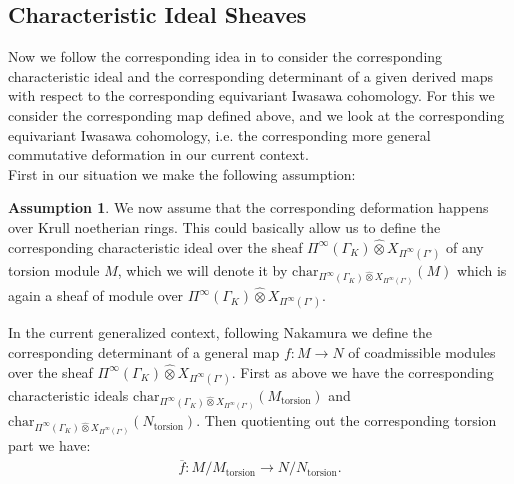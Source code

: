 \documentclass[12pt]{amsart}
\theoremstyle{definition}
\numberwithin{equation}{section}
\newtheorem{assumption}[theorem]{Assumption}
\begin{document}
\subsection{Characteristic Ideal Sheaves} \label{section5.2}


\indent Now we follow the corresponding idea in \cite{Nakamura1} to consider the corresponding characteristic ideal and the corresponding determinant of a given derived maps with respect to the corresponding equivariant Iwasawa cohomology. For this we consider the corresponding map defined above, and we look at the corresponding equivariant Iwasawa cohomology, i.e. the corresponding more general commutative deformation in our current context.\\

\indent First in our situation we make the following assumption:

\begin{assumption}
We now assume that the corresponding deformation happens over Krull noetherian rings. This could basically allow us to define the corresponding characteristic ideal over the sheaf $\Pi^\infty(\Gamma_K)\widehat{\otimes} X_{\Pi^\infty(\Gamma')}$ of any torsion module $M$, which we will denote it by $\mathrm{char}_{\Pi^\infty(\Gamma_K)\widehat{\otimes}X_{\Pi^\infty(\Gamma')}}(M)$ which is again a sheaf of module over $\Pi^\infty(\Gamma_K)\widehat{\otimes} X_{\Pi^\infty(\Gamma')}$.	
\end{assumption}



\indent In the current generalized context, following Nakamura \cite[Section 3.4]{Nakamura1} we define the corresponding determinant of a general map $f:M\rightarrow N$ of coadmissible modules over the sheaf $\Pi^\infty(\Gamma_K)\widehat{\otimes}X_{\Pi^\infty(\Gamma')}$. First as above we have the corresponding characteristic ideals $\mathrm{char}_{\Pi^\infty(\Gamma_K)\widehat{\otimes}X_{\Pi^\infty(\Gamma')}}(M_\mathrm{torsion})$ and $\mathrm{char}_{\Pi^\infty(\Gamma_K)\widehat{\otimes}X_{\Pi^\infty(\Gamma')}}(N_\mathrm{torsion})$. Then quotienting out the corresponding torsion part we have:
\begin{align}
\overline{f}:M/M_{\mathrm{torsion}}\rightarrow 	N/N_{\mathrm{torsion}}.
\end{align}
\end{document}

